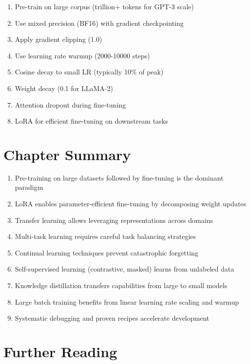 \begin{algorithm}[H]
\caption{Training Recipe for LLMs}
\begin{enumerate}
    \item Pre-train on large corpus (trillion+ tokens for GPT-3 scale)
    \item Use mixed precision (BF16) with gradient checkpointing
    \item Apply gradient clipping (1.0)
    \item Use learning rate warmup (2000-10000 steps)
    \item Cosine decay to small LR (typically 10\% of peak)
    \item Weight decay (0.1 for LLaMA-2)
    \item Attention dropout during fine-tuning
    \item LoRA for efficient fine-tuning on downstream tasks
\end{enumerate}
\end{algorithm}

\section{Chapter Summary}

\begin{enumerate}
    \item Pre-training on large datasets followed by fine-tuning is the dominant paradigm
    \item LoRA enables parameter-efficient fine-tuning by decomposing weight updates
    \item Transfer learning allows leveraging representations across domains
    \item Multi-task learning requires careful task balancing strategies
    \item Continual learning techniques prevent catastrophic forgetting
    \item Self-supervised learning (contrastive, masked) learns from unlabeled data
    \item Knowledge distillation transfers capabilities from large to small models
    \item Large batch training benefits from linear learning rate scaling and warmup
    \item Systematic debugging and proven recipes accelerate development
\end{enumerate}

\section{Further Reading}

